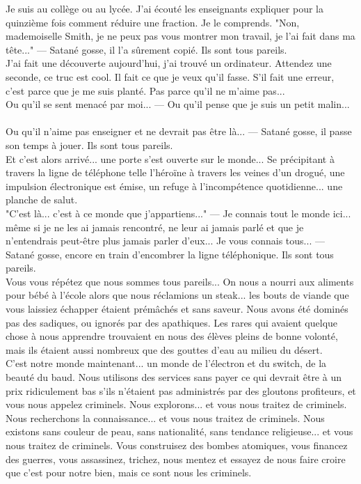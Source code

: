 \documentclass[11pt,twoside,a4paper]{book}
\begin{document}
Je suis au coll{\`e}ge ou au lyc{\'e}e. J'ai {\'e}cout{\'e} les enseignants expliquer pour la quinzi{\`e}me fois comment r{\'e}duire une fraction. Je le comprends. "Non, mademoiselle Smith, je ne peux pas vous montrer mon travail, je l'ai fait dans ma t{\^e}te..." --- Satan{\'e} gosse, il l'a s{\^u}rement copi{\'e}. Ils sont tous pareils. ~\\

J'ai fait une d{\'e}couverte aujourd'hui, j'ai trouv{\'e} un ordinateur. Attendez une seconde, ce truc est cool. Il fait ce que je veux qu'il fasse. S'il fait une erreur, c'est parce que je me suis plant{\'e}. Pas parce qu'il ne m'aime pas... ~\\
Ou qu'il se sent menac{\'e} par moi... --- Ou qu'il pense que je suis un petit malin... ~\\
Ou qu'il n'aime pas enseigner et ne devrait pas {\^e}tre l{\`a}... --- Satan{\'e} gosse, il passe son temps {\`a} jouer. Ils sont tous pareils. ~\\

Et c'est alors arriv{\'e}... une porte s'est ouverte sur le monde... Se pr{\'e}cipitant {\`a} travers la ligne de t{\'e}l{\'e}phone telle l'h{\'e}ro{\"i}ne {\`a} travers les veines d'un drogu{\'e}, une impulsion {\'e}lectronique est {\'e}mise, un refuge {\`a} l'incomp{\'e}tence quotidienne... une planche de salut. ~\\

"C'est l{\`a}... c'est {\`a} ce monde que j'appartiens..." --- Je connais tout le monde ici... m{\^e}me si je ne les ai jamais rencontr{\'e}, ne leur ai jamais parl{\'e} et que je n'entendrais peut-{\^e}tre plus jamais parler d'eux... Je vous connais tous... --- Satan{\'e} gosse, encore en train d'encombrer la ligne t{\'e}l{\'e}phonique. Ils sont tous pareils. ~\\

Vous vous r{\'e}p{\'e}tez que nous sommes tous pareils... On nous a nourri aux aliments pour b{\'e}b{\'e} {\`a} l'{\'e}cole alors que nous r{\'e}clamions un steak... les bouts de viande que vous laissiez {\'e}chapper {\'e}taient pr{\'e}m{\^a}ch{\'e}s et sans saveur. Nous avons {\'e}t{\'e} domin{\'e}s pas des sadiques, ou ignor{\'e}s par des apathiques. Les rares qui avaient quelque chose {\`a} nous apprendre trouvaient en nous des {\'e}l{\`e}ves pleins de bonne volont{\'e}, mais ils {\'e}taient aussi nombreux que des gouttes d'eau au milieu du d{\'e}sert. ~\\

C'est notre monde maintenant... un monde de l'{\'e}lectron et du switch, de la beaut{\'e} du baud. Nous utilisons des services sans payer ce qui devrait {\^e}tre {\`a} un prix ridiculement bas s'ils n'{\'e}taient pas administr{\'e}s par des gloutons profiteurs, et vous nous appelez criminels. Nous explorons... et vous nous traitez de criminels. Nous recherchons la connaissance... et vous nous traitez de criminels. Nous existons sans couleur de peau, sans nationalit{\'e}, sans tendance religieuse... et vous nous traitez de criminels. Vous construisez des bombes atomiques, vous financez des guerres, vous assassinez, trichez, nous mentez et essayez de nous faire croire que c'est pour notre bien, mais ce sont nous les criminels. ~\\
\end{document}
